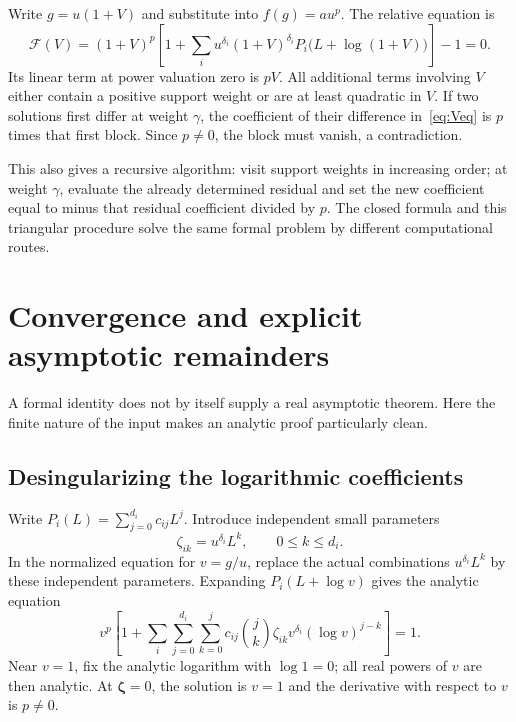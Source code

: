\documentclass[11pt,a4paper]{article}
\numberwithin{equation}{section}
\theoremstyle{definition}
\theoremstyle{remark}
\begin{document}
Write $g=u(1+V)$ and substitute into $f(g)=a u^p$. The relative equation is
\begin{equation}\label{eq:Veq}
 \mathcal F(V)=
 (1+V)^p\left[1+\sum_i u^{\delta_i}(1+V)^{\delta_i}
 P_i\bigl(L+\log(1+V)\bigr)\right]-1=0.
\end{equation}
Its linear term at power valuation zero is $pV$. All additional terms
involving $V$ either contain a positive support weight or are at least
quadratic in $V$. If two solutions first differ at weight $\gamma$, the
coefficient of their difference in~\eqref{eq:Veq} is $p$ times that first
block. Since $p\ne0$, the block must vanish, a contradiction.

This also gives a recursive algorithm: visit support weights in increasing
order; at weight $\gamma$, evaluate the already determined residual and
set the new coefficient equal to minus that residual coefficient divided
by $p$. The closed formula and this triangular procedure solve the same
formal problem by different computational routes.

\section{Convergence and explicit asymptotic remainders}
\label{sec:convergence}

A formal identity does not by itself supply a real asymptotic theorem.
Here the finite nature of the input makes an analytic proof particularly
clean.

\subsection{Desingularizing the logarithmic coefficients}

Write $P_i(L)=\sum_{j=0}^{d_i}c_{ij}L^j$. Introduce independent small
parameters
\[
 \zeta_{ik}=u^{\delta_i}L^k,\qquad 0\le k\le d_i.
\]
In the normalized equation for $v=g/u$, replace the actual combinations
$u^{\delta_i}L^k$ by these independent parameters. Expanding
$P_i(L+\log v)$ gives the analytic equation
\begin{equation}\label{eq:implicitfinite}
 v^p\left[
 1+\sum_i\sum_{j=0}^{d_i}\sum_{k=0}^{j}
 c_{ij}\binom jk\zeta_{ik}v^{\delta_i}(\log v)^{j-k}
 \right]=1.
\end{equation}
Near $v=1$, fix the analytic logarithm with $\log1=0$; all real powers of
$v$ are then analytic. At $\boldsymbol\zeta=0$, the solution is $v=1$
and the derivative with respect to $v$ is $p\ne0$.
\end{document}
